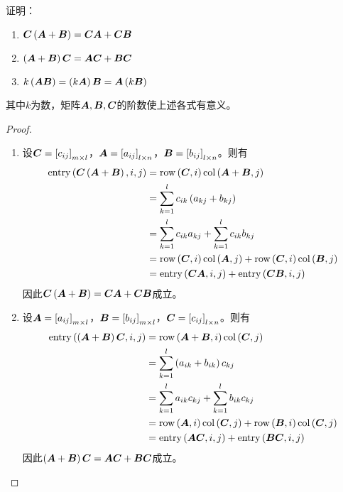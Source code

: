 \begin{extraprob}\label{extra-1.4}
    证明：
    \begin{enumerate}
        \item \(\matc\spar{\mata+\matb}=\matc\mata+\matc\matb\)
        \item \(\spar{\mata+\matb}\matc=\mata\matc+\matb\matc\)
        \item \(k\spar{\mata\matb}=\spar{k\mata}\matb=\mata\spar{k\matb}\)
    \end{enumerate}
    其中\(k\)为数，矩阵\(\mata,\matb,\matc\)的阶数使上述各式有意义。
\end{extraprob}
\begin{proof}
    \begin{enumerate}
        \item
              {
              设\(\matc=\mat{c_{ij}}_{m\times l}\)，\(\mata=\mat{a_{ij}}_{l\times n}\)，\(\matb=\mat{b_{ij}}_{l\times n}\)。则有
              \begin{align*}
                  \entry{\matc\spar{\mata+\matb}}{i}{j} & =\row{\matc}{i}\col{\mata+\matb}{j}                        \\
                                                        & =\sum_{k=1}^lc_{ik}\spar{a_{kj}+b_{kj}}                    \\
                                                        & =\sum_{k=1}^lc_{ik}a_{kj}+\sum_{k=1}^lc_{ik}b_{kj}         \\
                                                        & =\row{\matc}{i}\col{\mata}{j}+\row{\matc}{i}\col{\matb}{j} \\
                                                        & =\entry{\matc\mata}{i}{j}+\entry{\matc\matb}{i}{j}
              \end{align*}
              因此\(\matc\spar{\mata+\matb}=\matc\mata+\matc\matb\)成立。
              }

        \item
              {
              设\(\mata=\mat{a_{ij}}_{m\times l}\)，\(\matb=\mat{b_{ij}}_{m\times l}\)，\(\matc=\mat{c_{ij}}_{l\times n}\)。则有
              \begin{align*}
                  \entry{\spar{\mata+\matb}\matc}{i}{j} & =\row{\mata+\matb}{i}\col{\matc}{j}                        \\
                                                        & =\sum_{k=1}^l\spar{a_{ik}+b_{ik}}c_{kj}                    \\
                                                        & =\sum_{k=1}^la_{ik}c_{kj}+\sum_{k=1}^lb_{ik}c_{kj}         \\
                                                        & =\row{\mata}{i}\col{\matc}{j}+\row{\matb}{i}\col{\matc}{j} \\
                                                        & =\entry{\mata\matc}{i}{j}+\entry{\matb\matc}{i}{j}
              \end{align*}
              因此\(\spar{\mata+\matb}\matc=\mata\matc+\matb\matc\)成立。
              }


\end{enumerate}
\end{proof}
